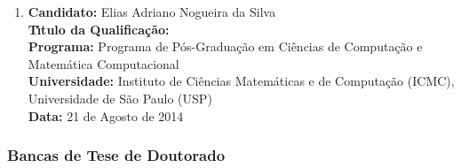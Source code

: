 \documentclass[a4paper,oneside,10pt]{article}
\begin{document}
\begin{enumerate}
\item       \textbf{Candidato:} Elias Adriano Nogueira da Silva \mbox{} \\
            \textbf{T\'{\i}tulo da Qualifica\c{c}\~{a}o:} \\
            \textbf{Programa:} Programa de Pós-Graduação em Ciências de Computação e Matemática Computacional\\
            \textbf{Universidade:} Instituto de Ciências Matemáticas e de Computação (ICMC), Universidade de São Paulo (USP)\\
            \textbf{Data:} 21 de Agosto de 2014
\end{enumerate}


\subsubsection{Bancas de Tese de Doutorado}
\end{document}
